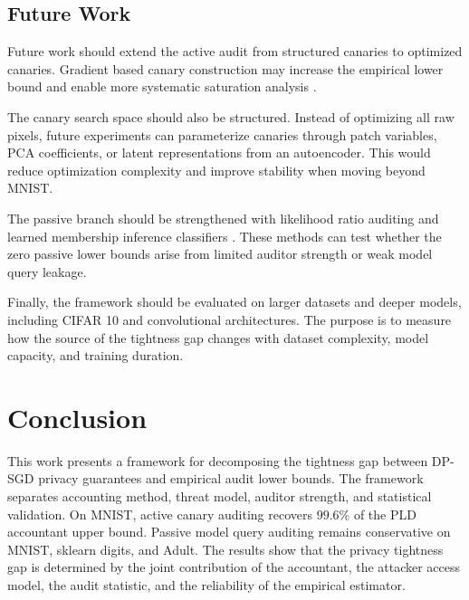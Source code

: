 \documentclass{article}
\begin{document}
\subsection{Future Work}
Future work should extend the active audit from structured canaries to optimized canaries. Gradient based canary construction may increase the empirical lower bound and enable more systematic saturation analysis \citep{nasr2023tight,steinke2023privacy}.

The canary search space should also be structured. Instead of optimizing all raw pixels, future experiments can parameterize canaries through patch variables, PCA coefficients, or latent representations from an autoencoder. This would reduce optimization complexity and improve stability when moving beyond MNIST.

The passive branch should be strengthened with likelihood ratio auditing and learned membership inference classifiers \citep{carlini2022membership,kazmi2024panoramia,annamalai2024nearly}. These methods can test whether the zero passive lower bounds arise from limited auditor strength or weak model query leakage.

Finally, the framework should be evaluated on larger datasets and deeper models, including CIFAR 10 and convolutional architectures. The purpose is to measure how the source of the tightness gap changes with dataset complexity, model capacity, and training duration.

\section{Conclusion}
This work presents a framework for decomposing the tightness gap between DP-SGD privacy guarantees and empirical audit lower bounds. The framework separates accounting method, threat model, auditor strength, and statistical validation. On MNIST, active canary auditing recovers $99.6\%$ of the PLD accountant upper bound. Passive model query auditing remains conservative on MNIST, sklearn digits, and Adult. The results show that the privacy tightness gap is determined by the joint contribution of the accountant, the attacker access model, the audit statistic, and the reliability of the empirical estimator.



\end{document}
